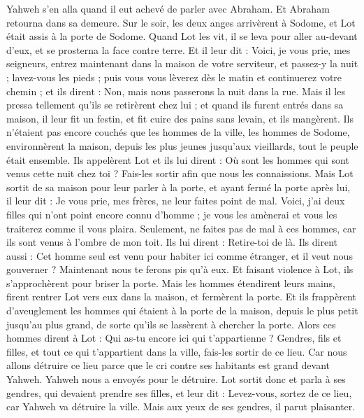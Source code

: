 \begin{multicols}{2}
Yahweh s'en alla quand il eut achevé de parler avec Abraham. Et Abraham retourna dans sa demeure.
\VerseOne{}Sur le soir, les deux anges arrivèrent à Sodome, et Lot était assis à la porte de Sodome. Quand Lot les vit, il se leva pour aller au-devant d'eux, et se prosterna la face contre terre.
Et il leur dit : Voici, je vous prie, mes seigneurs, entrez maintenant dans la maison de votre serviteur, et passez-y la nuit ; lavez-vous les pieds ; puis vous vous lèverez dès le matin et continuerez votre chemin ; et ils dirent : Non, mais nous passerons la nuit dans la rue.
Mais il les pressa tellement qu'ils se retirèrent chez lui ; et quand ils furent entrés dans sa maison, il leur fit un festin, et fit cuire des pains sans levain, et ils mangèrent.
Ils n’étaient pas encore couchés que les hommes de la ville, les hommes de Sodome, environnèrent la maison, depuis les plus jeunes jusqu'aux vieillards, tout le peuple était ensemble.
Ils appelèrent Lot et ils lui dirent : Où sont les hommes qui sont venus cette nuit chez toi ? Fais-les sortir afin que nous les connaissions.
Mais Lot sortit de sa maison pour leur parler à la porte, et ayant fermé la porte après lui,
il leur dit : Je vous prie, mes frères, ne leur faites point de mal.
Voici, j'ai deux filles qui n'ont point encore connu d'homme ; je vous les amènerai et vous les traiterez comme il vous plaira. Seulement, ne faites pas de mal à ces hommes, car ils sont venus à l'ombre de mon toit.
Ils lui dirent : Retire-toi de là. Ils dirent aussi : Cet homme seul est venu pour habiter ici comme étranger, et il veut nous gouverner ? Maintenant nous te ferons pis qu'à eux. Et faisant violence à Lot,  ils s'approchèrent pour briser la porte.
Mais les hommes étendirent leurs mains, firent rentrer Lot vers eux dans la maison, et fermèrent la porte.
Et ils frappèrent d’aveuglement les hommes qui étaient à la porte de la maison, depuis le plus petit jusqu'au plus grand, de sorte qu'ils se lassèrent à chercher la porte.
Alors ces hommes dirent à Lot : Qui as-tu encore ici qui t'appartienne ? Gendres, fils et filles, et tout ce qui t'appartient dans la ville, fais-les sortir de ce lieu.
Car nous allons détruire ce lieu parce que le cri contre ses habitants est grand devant Yahweh. Yahweh nous a envoyés pour le détruire.
Lot sortit donc et parla à ses gendres, qui devaient prendre ses filles, et leur dit : Levez-vous, sortez de ce lieu, car Yahweh va détruire la ville. Mais aux yeux de ses gendres, il parut plaisanter.

\end{multicols}
